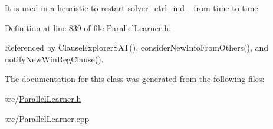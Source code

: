 It is used in a heuristic to restart solver\-\_\-ctrl\-\_\-ind\-\_\- from time to time. 

Definition at line 839 of file Parallel\-Learner.\-h.



Referenced by Clause\-Explorer\-S\-A\-T(), consider\-New\-Info\-From\-Others(), and notify\-New\-Win\-Reg\-Clause().



The documentation for this class was generated from the following files\-:\begin{DoxyCompactItemize}
\item 
src/\hyperlink{ParallelLearner_8h}{Parallel\-Learner.\-h}\item 
src/\hyperlink{ParallelLearner_8cpp}{Parallel\-Learner.\-cpp}\end{DoxyCompactItemize}
